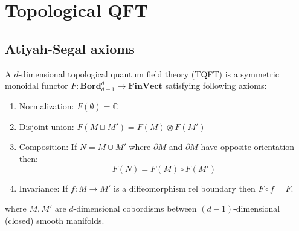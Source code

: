 	
\section{Topological QFT}
\subsection{Atiyah-Segal axioms}

	\begin{axiom}
		A $d$-dimensional topological quantum field theory (TQFT) is a symmetric monoidal functor $F:\textbf{Bord}_{d-1}^d\rightarrow\textbf{FinVect}$ satisfying following axioms:
		\begin{enumerate}
			\item Normalization: $F(\emptyset)=\mathbb{C}$
			\item Disjoint union: $F(M\sqcup M') = F(M)\otimes F(M')$
			\item Composition: If $N=M\cup M'$ where $\partial M$ and $\partial M$ have opposite orientation then: \[F(N) = F(M)\circ F(M')\]
			\item Invariance: If $f: M\rightarrow M'$ is a diffeomorphism rel boundary then $F\circ f = F$.
		\end{enumerate}
		where $M, M'$ are $d$-dimensional cobordisms between $(d-1)$-dimensional (closed) smooth manifolds.
	\end{axiom}
	
